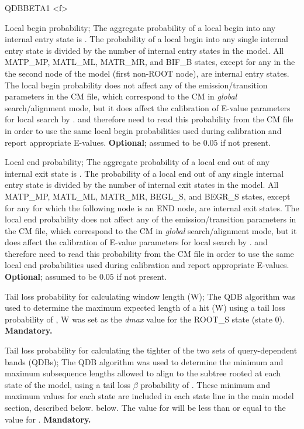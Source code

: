 \begin{sreitems}{QDBBETA1 <f>}
\item [\emprog{PBEGIN <f>}] Local begin probability; The aggregate
probability of a local begin into any internal entry state is
. The probability of a local begin into any single internal
entry state is  divided by the number of internal entry
states in the model. All MATP\_MP, MATL\_ML, MATR\_MR, and BIF\_B
states, except for any in the the second node of the model (first
non-ROOT node), are internal entry states. The local begin probability
does not affect any of the emission/transition parameters in the CM
file, which correspond to the CM in \emph{global} search/alignment
mode, but it does affect the calibration of E-value parameters for
local search by .  and 
therefore need to read this probability from the CM file in order to
use the same local begin probabilities used during calibration and
report appropriate E-values. \textbf{Optional}; assumed to be $0.05$
if not present.

\item [\emprog{PEND <f>}] Local end probability; The aggregate
probability of a local end out of any internal exit state is
. The probability of a local end out of any single internal
entry state is  divided by the number of internal exit
states in the model. All MATP\_MP, MATL\_ML, MATR\_MR, BEGL\_S, and
BEGR\_S states, except for any for which the following node is an END
node, are internal exit states. The local end probability
does not affect any of the emission/transition parameters in the CM
file, which correspond to the CM in \emph{global} search/alignment
mode, but it does affect the calibration of E-value parameters for
local search by .  and 
therefore need to read this probability from the CM file in order to
use the same local end probabilities used during calibration and
report appropriate E-values. \textbf{Optional}; assumed to be $0.05$
if not present.

\item [\emprog{WBETA <f>}] Tail loss probability for calculating
  window length (W); The QDB algorithm \citep{NawrockiEddy07} was used
  to determine the maximum expected length of a hit (W) using a tail
  loss probability of , W was set as the \emph{dmax} value for the
  ROOT\_S state (state 0). \textbf{Mandatory.}

\item [\emprog{QDBBETA1 <f>}] Tail loss probability for calculating
  the tighter of the two sets of query-dependent bands (QDBs); The QDB
  algorithm \citep{NawrockiEddy07} was used to determine the minimum
  and maximum subsequence lengths allowed to align to the subtree
  rooted at each state of the model, using a tail loss $\beta$
  probability of . These minimum and maximum values for each state
  are included in each state line in the main model section, described
  below.  below. The  value for  will be
  less than or equal to the  value for .
  \textbf{Mandatory.}


\end{sreitems}
